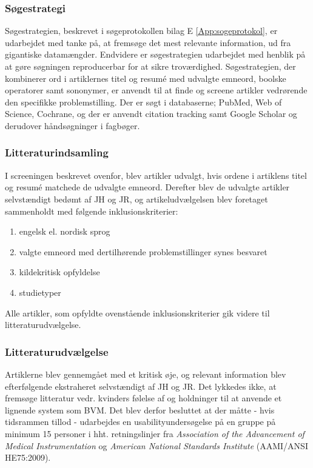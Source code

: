 	\subsubsection{Søgestrategi}
	Søgestrategien, beskrevet i søgeprotokollen bilag E \ref{App:sogeprotokol}, er udarbejdet med tanke på, at fremsøge det mest relevante information, ud fra gigantiske datamængder. Endvidere er søgestrategien udarbejdet med henblik på at gøre søgningen reproducerbar for at sikre troværdighed.  
	Søgestrategien, der kombinerer ord i artiklernes titel og resumé med udvalgte emneord, boolske operatorer samt sononymer, er anvendt til at finde og screene artikler vedrørende den specifikke problemstilling. Der er søgt i databaserne; PubMed, Web of Science, Cochrane, og der er anvendt citation tracking samt Google Scholar og derudover håndsøgninger i fagbøger.  
	
	\subsubsection{Litteraturindsamling}
	I screeningen beskrevet ovenfor, blev artikler udvalgt, hvis ordene i artiklens titel og resumé matchede de udvalgte emneord. Derefter blev de udvalgte artikler selvstændigt bedømt af JH og JR, og artikeludvælgelsen blev foretaget sammenholdt med følgende inklusionskriterier:
	
		\begin{enumerate}
			\item engelsk el. nordisk sprog 
			\item valgte emneord med dertilhørende problemstillinger synes besvaret
			\item kildekritisk opfyldelse
			\item studietyper
		\end{enumerate} 
		
	Alle artikler, som opfyldte ovenstående inklusionskriterier gik videre til litteraturudvælgelse. 	
		
	\subsubsection{Litteraturudvælgelse}	
	Artiklerne blev gennemgået med et kritisk øje, og relevant information blev efterfølgende ekstraheret selvstændigt af JH og JR. Det lykkedes ikke, at fremsøge litteratur vedr. kvinders følelse af og holdninger til at anvende et lignende system som BVM. Det blev derfor besluttet at der måtte - hvis tidsrammen tillod - udarbejdes en usabilityundersøgelse på en gruppe på minimum 15 personer i hht. retningslinjer fra \textit{Association of the Advancement of Medical Instrumentation} og \textit{American National Standards Institute} (AAMI/ANSI HE75:2009). \\
	
